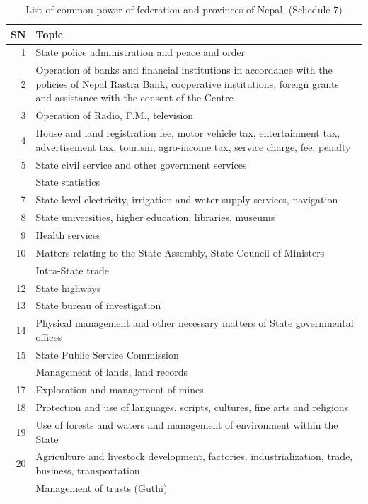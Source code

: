 \documentclass[
  openany]{book}
\begin{document}
\begingroup\fontsize{10}{12}\selectfont

\begin{longtable}[t]{r>{\raggedright\arraybackslash}p{35em}}
\caption{\label{tab:power-division-fed-prov}List of common power of federation and provinces of Nepal. (Schedule 7)}\\
\toprule
SN & Topic\\
\midrule
1 & State police administration and peace and order\\
2 & Operation of banks and financial institutions in accordance with the policies of Nepal Rastra Bank, cooperative institutions, foreign grants and assistance with the consent of the Centre\\
3 & Operation of Radio, F.M., television\\
4 & House and land registration fee, motor vehicle tax, entertainment tax, advertisement tax, tourism, agro-income tax, service charge, fee, penalty\\
5 & State civil service and other government services\\
\addlinespace
6 & State statistics\\
7 & State level electricity, irrigation and water supply services, navigation\\
8 & State universities, higher education, libraries, museums\\
9 & Health services\\
10 & Matters relating to the State Assembly, State Council of Ministers\\
\addlinespace
11 & Intra-State trade\\
12 & State highways\\
13 & State bureau of investigation\\
14 & Physical management and other necessary matters of State governmental offices\\
15 & State Public Service Commission\\
\addlinespace
16 & Management of lands, land records\\
17 & Exploration and management of mines\\
18 & Protection and use of languages, scripts, cultures, fine arts and religions\\
19 & Use of forests and waters and management of environment within the State\\
20 & Agriculture and livestock development, factories, industrialization, trade, business, transportation\\
\addlinespace
21 & Management of trusts (Guthi)\\
\bottomrule
\end{longtable}
\endgroup{}
\end{document}
